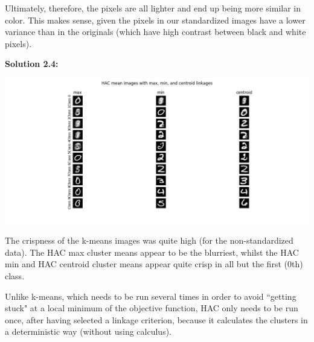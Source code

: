 \documentclass[submit]{harvardml}
\begin{document}
Ultimately, therefore, the pixels are all lighter and end up being more similar in color. This makes sense, given the pixels in our standardized images have a lower variance than in the originals (which have high contrast between black and white pixels).

\noindent\textbf{Solution 2.4:}\\
\begin{center}
    \includegraphics[scale=0.6]{2.4.png}
\end{center}
The crispness of the k-means images was quite high (for the non-standardized data). The HAC max cluster means appear to be the blurriest, whilst the HAC min and HAC centroid cluster means appear quite crisp in all but the first (0th) class.

Unlike k-means, which needs to be run several times in order to avoid ``getting stuck" at a local minimum of the objective function, HAC only needs to be run once, after having selected a linkage criterion, because it calculates the clusters in a deterministic way (without using calculus).
\end{document}
